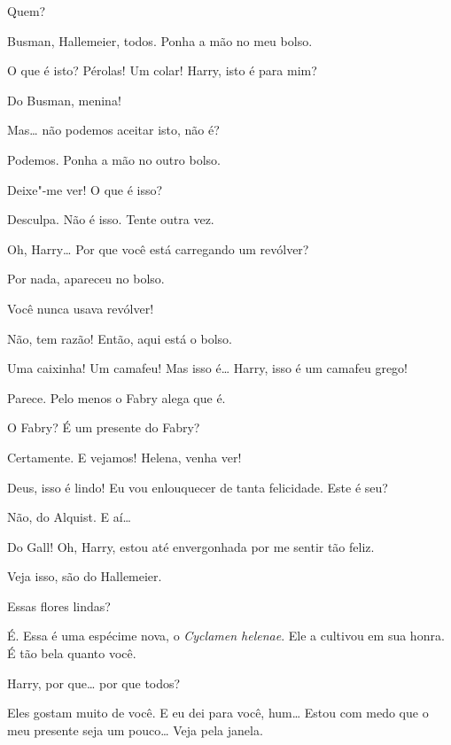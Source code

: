  Quem?

 Busman, Hallemeier, todos. Ponha a mão no meu bolso.

  O que é isto?  Pérolas! Um colar! Harry, isto é para mim?

 Do Busman, menina!

 Mas\ldots{} não podemos aceitar isto, não é?

 Podemos. Ponha a mão no outro bolso.

 Deixe"-me ver!  O que é isso?

 Desculpa.  Não é
isso. Tente outra vez.

 Oh, Harry\ldots{} Por que você está carregando um revólver?

 Por nada, apareceu no bolso.

 Você nunca usava revólver!

 Não, tem razão! Então, aqui está o bolso.

  Uma caixinha!  Um camafeu! Mas
isso é\ldots{} Harry, isso é um camafeu grego!

 Parece. Pelo menos o Fabry alega que é.

 O Fabry? É um presente do Fabry?

 Certamente.  E vejamos! Helena, venha ver!

  Deus, isso é lindo!  Eu
vou enlouquecer de tanta felicidade. Este é seu?

  Não, do Alquist. E aí\ldots{}

 Do Gall!  Oh, Harry, estou até
envergonhada por me sentir tão feliz.

 Veja isso, são do Hallemeier.

 Essas flores lindas?

 É. Essa é uma espécime nova, o \textit{Cyclamen helenae}. Ele a cultivou em sua
honra. É tão bela quanto você.

 Harry, por que\ldots{} por que todos?

 Eles gostam muito de você. E eu dei para você, hum\ldots{} Estou com medo que o
meu presente seja um pouco\ldots{} Veja pela janela.


